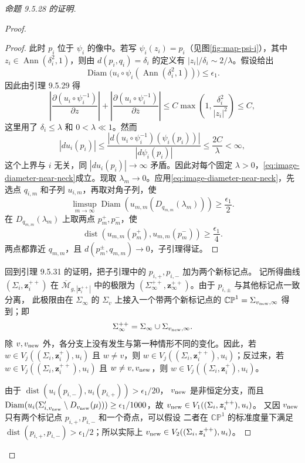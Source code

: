 \begin{proof}[命题 9.5.28 的证明]
\begin{proof}
\begin{proof}
此时 $p_i$ 位于 $\psi_i$ 的像中。若写
$\psi_i(z_i)=p_i$（见图\ref{fig:map-psi-i}），其中
$z_i\in\operatorname{Ann}(\delta_i^2,1)$，则由
$d(p_i,q_i)=\delta_i$ 的定义有
$|z_i|/\delta_i\sim2/\lambda$。假设给出
\[
 \operatorname{Diam}
 \bigl(u_i\circ\psi_i(\operatorname{Ann}(\delta_i^2,1))\bigr)
 \le\epsilon_1.
\]
因此由引理 9.5.29 得
\[
 \left|\frac{\partial(u_i\circ\psi_i^{-1})}{\partial z}\right|
 +\left|\frac{\partial(u_i\circ\psi_i^{-1})}{\partial\overline z}\right|
 \le C\max\left(1,\frac{\delta_i^2}{|z_i|^2}\right)\le C,
\]
这里用了 $\delta_i\le\lambda$ 和 $0<\lambda\ll1$。然而
\[
 |du_i(p_i)|
 \le\frac{|d(u_i\circ\psi_i^{-1})(\psi_i(p_i))|}{|d\psi_i(p_i)|}
 \le\frac{2C}{\lambda}<\infty,
\]
这个上界与 $i$ 无关，同 $|du_i(p_i)|\to\infty$ 矛盾。因此对每个固定
$\lambda>0$，\eqref{eq:image-diameter-near-neck}成立。现取
$\lambda_m\to0$。应用\eqref{eq:image-diameter-near-neck}，先选点 $q_{i,m}$ 和子列
$u_{i,m}$，再取对角子列，使
\[
 \limsup_{m\to\infty}
 \operatorname{Diam}(u_{m,m}(D_{q_{m,m}}(\lambda_m)))
 \ge\frac{\epsilon_1}{2}.
\]
在 $D_{q_{m,m}}(\lambda_m)$ 上取两点 $p_m^+,p_m^-$，使
\[
 \operatorname{dist}(u_{m,m}(p_m^+),u_{m,m}(p_m^-))
 \ge\frac{\epsilon_1}{4}.
\]
两点都靠近 $q_{m,m}$，且 $d(p_m^\pm,q_{m,m})\to0$，子引理得证。
\end{proof}

回到引理 9.5.31 的证明，把子引理中的 $p_{i,+},p_{i,-}$ 加为两个新标记点。
记所得曲线 $(\Sigma_i,\boldsymbol z_i^{++})$ 在
$\overline{\mathcal M}_{g,|\boldsymbol z_i^{++}|}$ 中的极限为
$(\Sigma_\infty^{++},\boldsymbol z_\infty^{++})$。由于 $p_{i,\pm}$ 与其他标记点一致分离，
此极限由在 $\Sigma_\infty$ 的 $\Sigma_v$ 上接入一个带两个新标记点的
$\mathbb{CP}^1=\Sigma_{v_{\rm new},\infty}$ 得到；即
\[
 \Sigma_\infty^{++}=\Sigma_\infty\cup\Sigma_{v_{\rm new},\infty}.
\]
除 $v,v_{\rm new}$ 外，各分支上没有发生与第一种情形不同的变化。因此，若
$w\in V_j((\Sigma_i,\boldsymbol z_i^+),u_i)$ 且 $w\ne v$，则
$w\in V_j((\Sigma_i,\boldsymbol z_i^{++}),u_i)$；反过来，若
$w\in V_j((\Sigma_i,\boldsymbol z_i^{++}),u_i)$ 且
$w\ne v,v_{\rm new}$，则 $w\in V_j((\Sigma_i,\boldsymbol z_i^+),u_i)$。

由于
$\operatorname{dist}(u_i(p_{i,-}),u_i(p_{i,+}))>\epsilon_1/20$，
$v_{\rm new}$ 是非恒定分支，而且
$\operatorname{Diam}(u_i(\Sigma_{i,v_{\rm new}}'\setminus
D_{v_{\rm new}}(\mu)))\ge\epsilon_1/1000$，故
$v_{\rm new}\in V_1((\Sigma_i,\boldsymbol z_i^{++}),u_i)$。
又因 $v_{\rm new}$ 只有两个标记点 $p_{i,+},p_{i,-}$ 和一个奇点，可以假设
二者在 $\mathbb{CP}^1$ 的标准度量下满足
$\operatorname{dist}(p_{i,+},p_{i,-})>\epsilon_1/2$；所以实际上
$v_{\rm new}\in V_2((\Sigma_i,\boldsymbol z_i^{++}),u_i)$。


\end{proof}
\end{proof}
